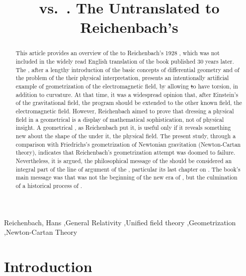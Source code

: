 \documentclass[final]{article}
\title{\scare{Geometrization of Physics} vs.\ \scare{Physicalization of Geometry}. The Untranslated \Ap to Reichenbach's \PRZL}
\author{}
\newcommand{\PRZL}{\citetitle{Reichenbach1928}\xspace}
\begin{document}
\maketitle


\begin{abstract}
This article provides an overview of the \Ap to Reichenbach's 1928 \PRZL, which was not included in the widely read English translation of the book published 30 years later. The \Ap, after a lengthy introduction of the basic concepts of differential geometry and of the problem of the their physical interpretation, presents an intentionally artificial example of geometrization of the electromagnetic field, by allowing \st to have torsion, in addition to curvature. At that time, it was a widespread opinion that, after Einstein's  of the gravitational field, the  program should be extended to the other known field, the electromagnetic field. However, Reichenbach aimed to prove that dressing a physical field in a geometrical  is a display of mathematical sophistication, not of physical insight. A geometrical , as Reichenbach put it, is useful only if it reveals something new about the shape of the  under it, the physical field. The present study, through a comparison with Friedrichs's geometrization of Newtonian gravitation (Newton-Cartan theory), indicates that Reichenbach's geometrization attempt was doomed to failure. Nevertheless, it is argued, the philosophical message of the \Ap should be considered an integral part of the line of argument of the \PRZL, particular its last chapter on \gr. The book's main message was that \gr was not the beginning of the new era of , but the culmination of a historical process of .
\end{abstract}



\begin{keywords}
Reichenbach, Hans \sep General Relativity \sep Unified field theory \sep Geometrization 
\sep Newton-Cartan Theory
\end{keywords}


\section*{Introduction}
\end{document}
